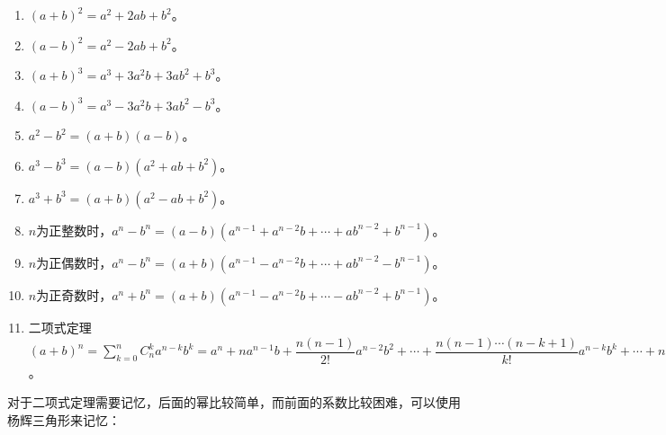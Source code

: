 \documentclass[UTF8, 12pt]{ctexart}
\begin{document}
        \begin{enumerate}
            \item $(a+b)^2=a^2+2ab+b^2$。
            \item $(a-b)^2=a^2-2ab+b^2$。
            \item $(a+b)^3=a^3+3a^2b+3ab^2+b^3$。
            \item $(a-b)^3=a^3-3a^2b+3ab^2-b^3$。
            \item $a^2-b^2=(a+b)(a-b)$。
            \item $a^3-b^3=(a-b)(a^2+ab+b^2)$。
            \item $a^3+b^3=(a+b)(a^2-ab+b^2)$。
            \item $n$为正整数时，$a^n-b^n=(a-b)(a^{n-1}+a^{n-2}b+\cdots+ab^{n-2}+b^{n-1})$。
            \item $n$为正偶数时，$a^n-b^n=(a+b)(a^{n-1}-a^{n-2}b+\cdots+ab^{n-2}-b^{n-1})$。
            \item $n$为正奇数时，$a^n+b^n=(a+b)(a^{n-1}-a^{n-2}b+\cdots-ab^{n-2}+b^{n-1})$。
            \item 二项式定理$(a+b)^n=\sum_{k=0}^nC_n^ka^{n-k}b^k=a^n+na^{n-1}b+\dfrac{n(n-1)}{2!}a^{n-2}b^2+\cdots+\dfrac{n(n-1)\cdots(n-k+1)}{k!}a^{n-k}b^k+\cdots+nab^{n-1}+b^n$。
        \end{enumerate}

        对于二项式定理需要记忆，后面的幂比较简单，而前面的系数比较困难，可以使用杨辉三角形来记忆：
\end{document}
